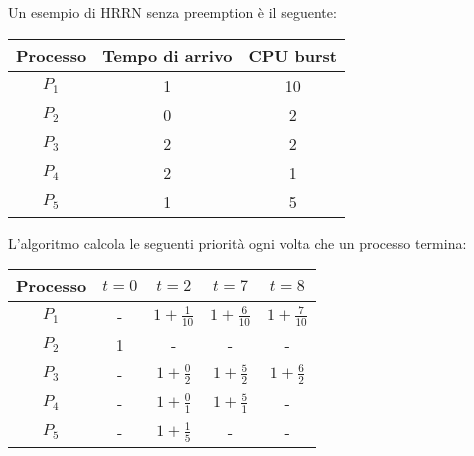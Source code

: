 \documentclass[a4paper]{article}
\begin{document}
\begin{example}
  Un esempio di HRRN senza preemption è il seguente:
  \begin{table}[H]
    \centering
    \begin{tabular}{c|c|c}
      Processo & Tempo di arrivo & CPU burst \\
      \hline
      \( P_1 \) & 1 & 10 \\
      \( P_2 \) & 0 & 2 \\
      \( P_3 \) & 2 & 2 \\
      \( P_4 \) & 2 & 1 \\
      \( P_5 \) & 1 & 5 \\
    \end{tabular}
  \end{table}
  L'algoritmo calcola le seguenti priorità ogni volta che un processo termina:

  \begin{table}[H]
    \centering
    \bgroup
    \def\arraystretch{1.5}
    \begin{tabular}{c|c|c|c|c}
      Processo & \( t=0 \) & \( t=2 \) & \( t=7 \) & \( t=8 \) \\
      \hline
      \( P_1 \) & - & \( 1+\frac{1}{10} \) & \( 1+\frac{6}{10} \) & \( 1+\frac{7}{10} \)  \\
      \( P_2 \) & \color{blue} 1 & - & - & - \\
      \( P_3 \) & - & \( 1+\frac{0}{2} \) & \( 1+\frac{5}{2} \) & \color{blue} \( 1+\frac{6}{2} \) \\
      \( P_4 \) & - & \( 1+\frac{0}{1} \) & \color{blue} \( 1+\frac{5}{1} \) & - \\
      \( P_5 \) & - & \color{blue} \( 1+\frac{1}{5} \) & - & - \\
    \end{tabular}
    \egroup
  \end{table}
  \begin{figure}[H]
    \centering
\end{figure}
\end{example}
\end{document}
